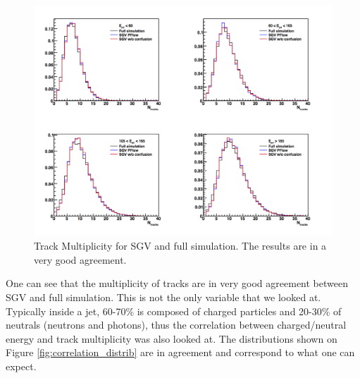 \documentclass[a4paper,12pt]{article}
\begin{document}
\begin{figure}[!h]
   \centering
    \includegraphics[scale=0.5]{multiplicity_jet_track.png} 
      \caption{Track Multiplicity for SGV and full simulation. The results are in a very good agreement.}
   \label{fig:trk_multiplicity}
\end{figure}

One can see that the multiplicity of tracks are in very good agreement between SGV and full simulation. This is not the only variable that we looked at. Typically inside a jet, 60-70\% is composed of charged particles and 20-30\% of neutrals (neutrons and photons), thus the correlation between charged/neutral energy and track multiplicity was also looked at. The distributions shown on Figure \ref{fig:correlation_distrib} are in agreement and correspond to what one can expect.
\end{document}
